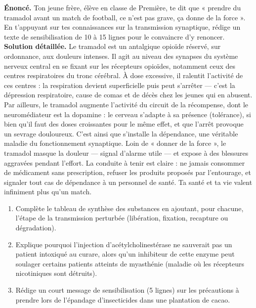 \documentclass[11pt]{article}
\begin{document}
\begin{exoresolu}
\textbf{Énoncé.} Ton jeune frère, élève en classe de Première, te dit que « prendre du tramadol avant un match de football, ce n'est pas grave, ça donne de la force ». En t'appuyant sur tes connaissances sur la transmission synaptique, rédige un texte de sensibilisation de 10 à 15 lignes pour le convaincre d'y renoncer.
\tcblower
\textbf{Solution détaillée.} Le tramadol est un antalgique opioïde réservé, sur ordonnance, aux douleurs intenses. Il agit au niveau des synapses du système nerveux central en se fixant sur les récepteurs opioïdes, notamment ceux des centres respiratoires du tronc cérébral. À dose excessive, il ralentit l'activité de ces centres : la respiration devient superficielle puis peut s'arrêter — c'est la dépression respiratoire, cause de comas et de décès chez les jeunes qui en abusent. Par ailleurs, le tramadol augmente l'activité du circuit de la récompense, dont le neuromédiateur est la dopamine : le cerveau s'adapte à sa présence (tolérance), si bien qu'il faut des doses croissantes pour le même effet, et que l'arrêt provoque un sevrage douloureux. C'est ainsi que s'installe la dépendance, une véritable maladie du fonctionnement synaptique. Loin de « donner de la force », le tramadol masque la douleur — signal d'alarme utile — et expose à des blessures aggravées pendant l'effort. La conduite à tenir est claire : ne jamais consommer de médicament sans prescription, refuser les produits proposés par l'entourage, et signaler tout cas de dépendance à un personnel de santé. Ta santé et ta vie valent infiniment plus qu'un match.
\end{exoresolu}

\begin{exercice}
\begin{enumerate}
\item Complète le tableau de synthèse des substances en ajoutant, pour chacune, l'étape de la transmission perturbée (libération, fixation, recapture ou dégradation).
\item Explique pourquoi l'injection d'acétylcholinestérase ne sauverait pas un patient intoxiqué au curare, alors qu'un inhibiteur de cette enzyme peut soulager certains patients atteints de myasthénie (maladie où les récepteurs nicotiniques sont détruits).
\item Rédige un court message de sensibilisation (5 lignes) sur les précautions à prendre lors de l'épandage d'insecticides dans une plantation de cacao.
\end{enumerate}
\end{exercice}
\end{document}
